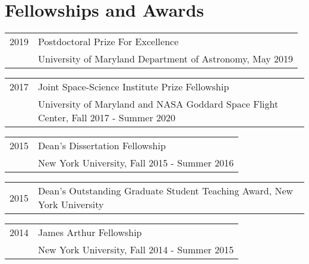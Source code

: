 \documentclass[letterpaper]{article}
\renewenvironment{itemize}{
  \begin{list}{}{
    \setlength{\leftmargin}{1.5em}
  }
}{
  \end{list}
}
\begin{document}



\section*{Fellowships and Awards}
\begin{itemize}

\item \begin{tabular}{ll}
2019 & Postdoctoral Prize For Excellence \\
& University of Maryland Department of Astronomy, May 2019 \\
\end{tabular}

\item \begin{tabular}{ll}
2017 & Joint Space-Science Institute Prize Fellowship \\
& University of Maryland and NASA Goddard Space Flight Center, Fall 2017 - Summer 2020 \\
\end{tabular}

\item \begin{tabular}{ll}
2015 & Dean's Dissertation Fellowship \\
& New York University, Fall 2015 - Summer 2016 \\
\end{tabular}

\item \begin{tabular}{ll}
2015 & Dean's Outstanding Graduate Student Teaching Award, New York University
\end{tabular}

\item \begin{tabular}{ll}
2014 & James Arthur Fellowship \\
& New York University, Fall 2014 - Summer 2015 \\
\end{tabular}


\end{itemize}
\end{document}
